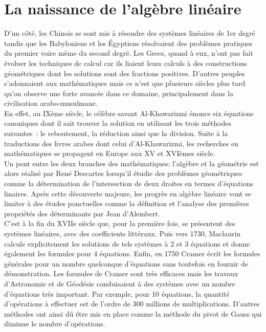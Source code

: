 \documentclass[a4paper,12pt]{report}
\begin{document}
\section{La naissance de l'algèbre linéaire}
D’un côté, les Chinois se sont mis à résoudre des systèmes linéaires de 1er degré tandis que les Babyloniens et les Égyptiens résolvaient des problèmes pratiques du premier voire même du second degré. Les Grecs, quand à eux, n’ont pas fait évoluer les techniques de calcul car ils liaient leurs calculs à des constructions géométriques dont les solutions sont des fractions positives. D’autres peuples s’adonnaient aux mathématiques mais ce n’est que plusieurs siècles plus tard qu’on observe une forte avancée dans ce domaine, principalement dans la civilisation arabo-musulmane.\\ 

En effet, au IXème siècle, le célèbre savant Al-Khawarizmi énonce six équations canoniques dont il sait trouver la solution en utilisant les trois méthodes suivantes : le reboutement, la réduction ainsi que la division. Suite à la traductions des livres arabes dont celui d’Al-Khawarizmi, les recherches en mathématiques se propagent en Europe aux XV et XVIèmes siècle.\\ 

Un pont entre les deux branches des mathématiques: l’algèbre et la géométrie est alors réalisé par René Descartes lorsqu’il étudie des problèmes géométriques comme la détermination de l’intersection de deux droites en termes d’équations linaires. Après cette découverte majeure, les progrès en algèbre linéaire vont se limiter à des études ponctuelles comme la définition et l'analyse des premières propriétés des déterminants par Jean d'Alembert.\\

C’est à la fin du XVIIe siècle que, pour la première fois, se présentent des systèmes linéaires, avec des coefficients littéraux. Puis vers 1730, Maclaurin calcule explicitement les solutions de tels systèmes à 2 et 3 équations et donne également les formules pour 4 équations. Enfin, en 1750 Cramer écrit les formules générales pour un nombre quelconque d’équations sans toutefois en fournir de démonstration. Les formules de Cramer sont très efficaces mais les travaux d’Astronomie et de Géodésie conduisaient à des systèmes avec un nombre d’équations très important. Par exemple, pour 10 équations, la quantité d’opérations à effectuer est de l’ordre de 300 millions de multiplications. D’autres méthodes ont ainsi dû être mis en place comme la méthode du pivot de Gauss qui diminue le nombre d’opérations.\\
\end{document}
